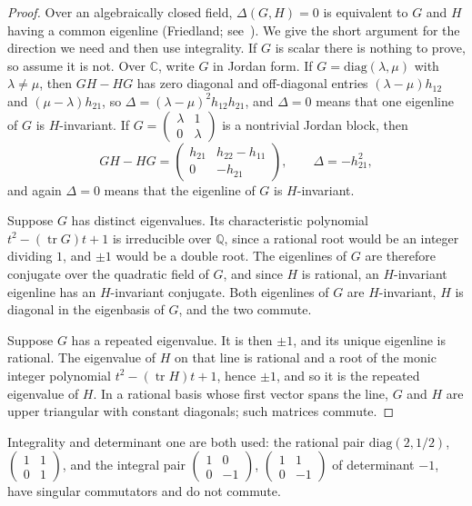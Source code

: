 \documentclass[11pt,a4paper]{article}
\numberwithin{equation}{section}
\theoremstyle{remark}
\newcommand{\Q}{\mathbb Q}
\begin{document}
\begin{proof}
Over an algebraically closed field, $\Delta(G,H)=0$ is equivalent to $G$ and $H$ having a common eigenline (Friedland; see~\cite[Proposition~2.13]{Florentino}). We give the short argument for the direction we need and then use integrality. If $G$ is scalar there is nothing to prove, so assume it is not. Over $\mathbb C$, write $G$ in Jordan form. If $G=\mathrm{diag}(\lambda,\mu)$ with $\lambda\ne\mu$, then $GH-HG$ has zero diagonal and off-diagonal entries $(\lambda-\mu)h_{12}$ and $(\mu-\lambda)h_{21}$, so $\Delta=(\lambda-\mu)^2h_{12}h_{21}$, and $\Delta=0$ means that one eigenline of $G$ is $H$-invariant. If $G=\left(\begin{smallmatrix}\lambda&1\\0&\lambda\end{smallmatrix}\right)$ is a nontrivial Jordan block, then
\[
GH-HG=\begin{pmatrix}h_{21}&h_{22}-h_{11}\\0&-h_{21}\end{pmatrix},\qquad \Delta=-h_{21}^2,
\]
and again $\Delta=0$ means that the eigenline of $G$ is $H$-invariant.

Suppose $G$ has distinct eigenvalues. Its characteristic polynomial $t^2-(\operatorname{tr}G)t+1$ is irreducible over $\Q$, since a rational root would be an integer dividing $1$, and $\pm1$ would be a double root. The eigenlines of $G$ are therefore conjugate over the quadratic field of $G$, and since $H$ is rational, an $H$-invariant eigenline has an $H$-invariant conjugate. Both eigenlines of $G$ are $H$-invariant, $H$ is diagonal in the eigenbasis of $G$, and the two commute.

Suppose $G$ has a repeated eigenvalue. It is then $\pm1$, and its unique eigenline is rational. The eigenvalue of $H$ on that line is rational and a root of the monic integer polynomial $t^2-(\operatorname{tr}H)t+1$, hence $\pm1$, and so it is the repeated eigenvalue of $H$. In a rational basis whose first vector spans the line, $G$ and $H$ are upper triangular with constant diagonals; such matrices commute.
\end{proof}

Integrality and determinant one are both used: the rational pair $\mathrm{diag}(2,1/2)$, $\left(\begin{smallmatrix}1&1\\0&1\end{smallmatrix}\right)$, and the integral pair $\left(\begin{smallmatrix}1&0\\0&-1\end{smallmatrix}\right)$, $\left(\begin{smallmatrix}1&1\\0&-1\end{smallmatrix}\right)$ of determinant $-1$, have singular commutators and do not commute.
\end{document}
